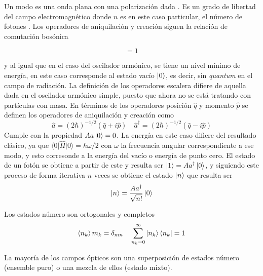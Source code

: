 Un modo es una onda plana con una polarización dada \cite{Agarwal_2012}. Es un grado de libertad del campo electromagnético donde $n$ es en este caso particular, el número de fotones \cite{Leonhardt}. Los operadores de aniquilación y creación siguen la relación de comutación bosónica

\begin{equation*}
  [\hat{a}, \hat{a}^{\dagger}] = 1
\end{equation*}

y al igual que en el caso del oscilador armónico, se tiene un nivel mínimo de energía, en este caso corresponde al estado vacío $\ket{0}$, es decir, sin \textit{quantum} en el campo de radiación. La definición de los operadores escalera difiere de aquella dada en el oscilador armónico simple, puesto que ahora no se está tratando con partículas con masa. En términos de los operadores posición $\hat{q}$ y momento $\hat{p}$ se definen los operadores de aniquilación y creación como
\begin{equation}\label{eq:crea-anni-def}
  \hat{a} = (2\hbar)^{-1/2}(\hat{q} + i\hat{p}) \quad \hat{a}^{\dagger} = (2\hbar)^{-1/2}(\hat{q} - i\hat{p})
\end{equation} %
Cumple con la propiedad $A{a} \ket{0} = 0$. La energía en este caso difiere del resultado clásico, ya que $\langle 0\vert\hat{H}\vert 0\rangle = \hbar\omega/2$ con $\omega$ la frecuencia angular correspondiente a ese modo, y esto corresonde a la energía del vacío o energía de punto cero. \cite{Walls} El estado de un fotón se obtiene a partir de este y resulta ser $\ket{1} = A{a}^{\dagger} \ket{0}$, y siguiendo este proceso de forma iterativa $n$ veces se obtiene el estado $\ket{n}$ que resulta ser
\begin{equation*}
  \ket{n} = \frac{A{a}^{\dagger}}{\sqrt{n!}}\ket{0}
\end{equation*}

Los estados número son ortogonales y completos
\begin{equation*}
  \braket{n_k}{m_k} = \delta_{mn} \quad \sum_{n_k = 0}^{\infty} \ket{n_k} \bra{n_k} = 1
\end{equation*}

La mayoría de los campos ópticos son una superposición de estados número (ensemble puro) o una mezcla de ellos (estado mixto).


